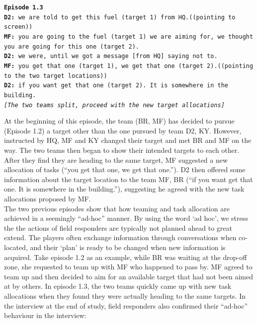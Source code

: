 \noindent\texttt{\textbf{Episode 1.3}\\
\textbf{D2:} we are told to get this fuel (target 1) from HQ.((pointing to screen))\\
\textbf{MF:} you are going to the fuel (target 1) we are aiming for, we thought you are going for this one (target 2).\\
\textbf{D2:} we were, until we got a message [from HQ] saying not to. \\
\textbf{MF:} you get that one (target 1), we get that one (target 2).((pointing to the two target locations))\\
\textbf{D2:} if you want get that one (target 2). It is somewhere in the building.\\
\emph{[The two teams split, proceed with the new target allocations]}\\}

At the beginning of this episode, the team (BR, MF) has decided to pursue (Episode 1.2) a target other than the one pursued by team D2, KY. However, instructed by HQ, MF and KY changed their target and met BR and MF on the way. The two teams then began to show their intended targets to each other. After they find they are heading to the same target, MF suggested a new allocation of tasks (``you get that one, we get that one.''). D2 then offered some information about the target location to the team MF, BR (``if you want get that one. It is somewhere in the building.''), suggesting he agreed with the new task allocations proposed by MF. \\

The two previous episodes show that how teaming and task allocation are achieved in a seemingly ``ad-hoc'' manner. By using the word `ad hoc', we stress the the actions of field responders are typically not planned ahead to great extend. The players often exchange information through conversations when co-located, and their `plan' is ready to be changed when new information is acquired. Take episode 1.2 as an example, while BR was waiting at the drop-off zone, she requested to team up with MF who happened to pass by. MF agreed to team up and then decided to aim for an available target that had not been aimed at by others. In episode 1.3, the two teams quickly came up with new task allocations when they found they were actually heading to the same targets. In the interview at the end of study, field responders also confirmed their ``ad-hoc'' behaviour in the interview:\\

